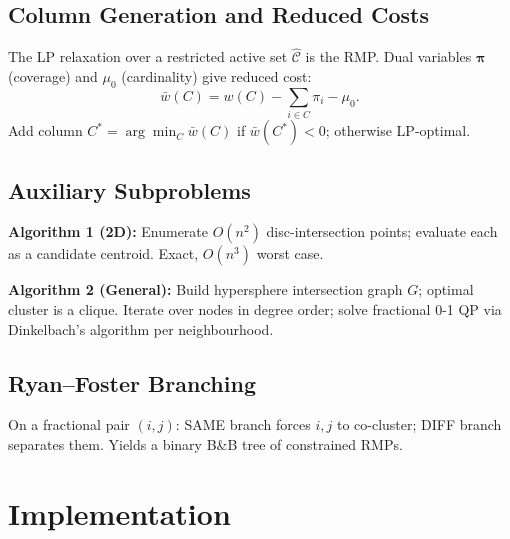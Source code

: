\documentclass[12pt,a4paper]{article}
\begin{document}
\subsection{Column Generation and Reduced Costs}

The LP relaxation over a restricted active set $\hat{\mathcal{C}}$ is the RMP. Dual variables $\boldsymbol{\pi}$ (coverage) and $\mu_0$ (cardinality) give reduced cost:
\begin{equation}
  \bar{w}(C) = w(C) - \sum_{i \in C}\pi_i - \mu_0.
\end{equation}
Add column $C^* = \arg\min_C \bar{w}(C)$ if $\bar{w}(C^*) < 0$; otherwise LP-optimal.

\subsection{Auxiliary Subproblems}

\textbf{Algorithm 1 (2D):} Enumerate $O(n^2)$ disc-intersection points; evaluate each as a candidate centroid. Exact, $O(n^3)$ worst case.

\textbf{Algorithm 2 (General):} Build hypersphere intersection graph $G$; optimal cluster is a clique. Iterate over nodes in degree order; solve fractional 0-1 QP via Dinkelbach's algorithm per neighbourhood.

\subsection{Ryan--Foster Branching}

On a fractional pair $(i,j)$: SAME branch forces $i,j$ to co-cluster; DIFF branch separates them. Yields a binary B\&B tree of constrained RMPs.

\section{Implementation}
\label{sec:impl}
\end{document}
